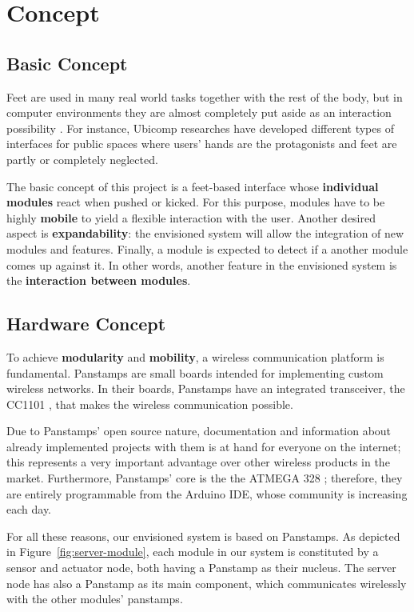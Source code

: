 \section{Concept}
\subsection{Basic Concept}
Feet are used in many real world tasks together with the rest of the body, but in computer environments they are almost completely put aside as an interaction possibility \cite{pakkanen}. For instance, Ubicomp researches have developed different types of interfaces for public spaces where users' hands are the protagonists and feet are partly or completely neglected. 

The basic concept of this project is a feet-based interface whose \textbf{individual modules} react when pushed or kicked. For this purpose, modules have to be highly \textbf {mobile} to yield a flexible interaction with the user. Another desired aspect is \textbf {expandability}: the envisioned system will allow the integration of new modules and features. Finally, a module is expected to detect if a another module comes up against it. In other words, another feature in the envisioned system is the \textbf{interaction between modules}. 

\subsection{Hardware Concept}
To achieve \textbf{modularity} and \textbf{mobility}, a wireless communication platform is fundamental.   
Panstamps \cite{panstamp} are small boards intended for implementing custom wireless networks. In their boards, Panstamps have an integrated transceiver, the CC1101 \cite{cc1101}, that makes the wireless communication possible. 

Due to Panstamps' open source nature, documentation and information about already implemented projects with them is at hand for everyone on the internet; this represents a very important advantage over other wireless products in the market. Furthermore, Panstamps' core is the the ATMEGA 328 \cite{atmega328}; therefore, they are entirely programmable from the Arduino IDE, whose community is increasing each day.

For all these reasons, our envisioned system is based on Panstamps. As depicted in Figure~\ref{fig:server-module}, each module in our system is constituted by a sensor and actuator node, both having a Panstamp as their nucleus. The server node has also a Panstamp as its main component, which communicates wirelessly with the other modules' panstamps. 

